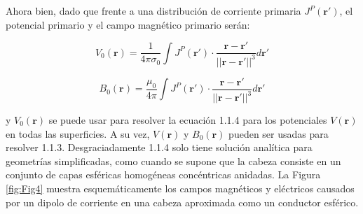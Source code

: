 \documentclass[11pt,letterpaper]{article}
\numberwithin{equation}{subsection}
\numberwithin{table}{subsection}
\begin{document}
\bigskip
\noindent Ahora bien, dado que frente a una distribución de corriente primaria $J^P(\mathbf{r}')$, el potencial primario y el campo magnético primario serán: 

\begin{equation}
V_0(\mathbf{r}) = \frac{1}{4\pi\sigma_0}\int J^P(\mathbf{r}')\cdot \frac{\mathbf{r}-\mathbf{r}'}{||\mathbf{r}-\mathbf{r}'||^3}d\mathbf{r}'
\end{equation}


\begin{equation}
B_0(\mathbf{r}) = \frac{\mu_0}{4\pi}\int J^P(\mathbf{r}')\cdot \frac{\mathbf{r}-\mathbf{r}'}{||\mathbf{r}-\mathbf{r}'||^3}d\mathbf{r}'
\end{equation}

\smallskip
\noindent y $V_0(\mathbf{r})$ se puede usar para resolver la ecuación 1.1.4 para los potenciales $V(\mathbf{r})$ en todas las superficies. A su vez, $V(\mathbf{r})$ y $B_0(\mathbf{r})$ pueden ser usadas para resolver 1.1.3. Desgraciadamente  1.1.4 solo tiene solución analítica para geometrías simplificadas, como cuando se supone que la cabeza consiste en un conjunto de capas esféricas homogéneas concéntricas anidadas\cite{de1988potential, zhang1995fast}. La Figura \ref{fig:Fig4} muestra esquemáticamente los campos magnéticos y eléctricos causados por un dipolo de corriente en una cabeza aproximada como un conductor esférico. 
\end{document}
